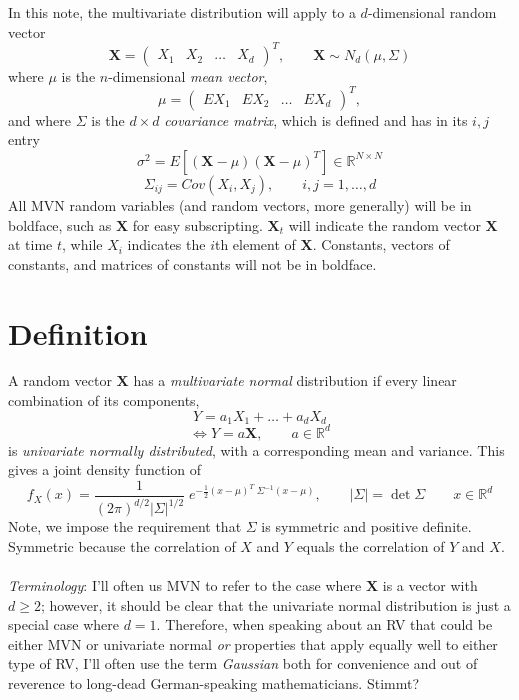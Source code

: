\documentclass[a4paper,12pt]{scrartcl}
\begin{document}
In this note, the multivariate distribution will apply to a
$d$-dimensional random vector 
\[ \mathbf{X} = \begin{pmatrix} X_1 & X_2 & \ldots & X_d \end{pmatrix}^T,
    \qquad \mathbf{X}  \sim N_d(\mu, \Sigma) \]
where $\mu$ is the $n$-dimensional \emph{mean vector},
\[ \mu = \begin{pmatrix} EX_1 & EX_2 & \ldots & EX_d \end{pmatrix}^T,
      \]
and where $\Sigma$ is the $d\times d$ \emph{covariance matrix}, which
is defined and has in its $i,j$ entry
\[ \sigma^2 = E\left[ (\mathbf{X} - \mu) (\mathbf{X}-\mu)^T\right] \in
   \mathbb{R}^{N\times N} \] 
\[ \Sigma_{ij} = Cov(X_i, X_j), \qquad i,j = 1, \ldots, d\]
All MVN random variables (and random vectors, more generally) will be in 
boldface, such as $\mathbf{X}$ for easy subscripting.  
$\mathbf{X}_t$ will indicate the random vector $\mathbf{X}$ at 
time $t$, while $X_i$ indicates the $i$th element of $\mathbf{X}$.
Constants, vectors of constants, and matrices of constants will not be 
in boldface.

\newpage

\section{Definition}

A random vector $\mathbf{X}$ has a \emph{multivariate normal} 
distribution if every linear combination of its components,
\[ Y = a_1 X_1 + \ldots + a_d X_d \] 
\[ \Leftrightarrow Y = {a} \mathbf{X}, \qquad
    {a} \in \mathbb{R}^{d} \]
is \emph{univariate normally
distributed}, with a corresponding mean and variance. This gives a 
joint density function of 
\begin{equation}
    \label{pdf}
   f_{X}({x}) = \frac{1}{(2\pi)^{d/2}\lvert \Sigma \rvert^{1/2}} 
	\; e^{ -\frac{1}{2} ({x} - \mu)^T \;
	\Sigma^{-1} ({x} - \mu) }, \qquad \lvert\Sigma\rvert =
      \det\Sigma \qquad x \in \mathbb{R}^d
\end{equation}
Note, we impose the requirement that $\Sigma$ is symmetric and positive 
definite.  Symmetric because the correlation of $X$ and $Y$ equals the
correlation of $Y$ and $X$. 
\\
\\
{\sl Terminology}: I'll often us MVN to refer to the case where $\mathbf{X}$ is
a vector with $d\geq2$; however, it should be clear that the univariate
normal distribution is just a special case where $d=1$. Therefore,
when speaking about an RV that could be either MVN or univariate normal
\emph{or} properties that apply equally well to either
type of RV, I'll often use the term \emph{Gaussian}
both for convenience and out of reverence to long-dead German-speaking
mathematicians. Stimmt?
\end{document}
